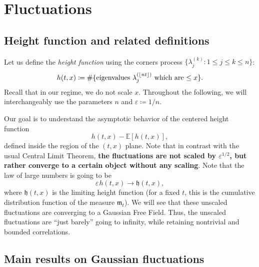 \documentclass[letterpaper,11pt,oneside,reqno]{book}
\numberwithin{equation}{chapter}  %
\newcommand{\ssp}{\hspace{1pt}}
\theoremstyle{definition}
\begin{document}
\section{Fluctuations}

\subsection{Height function and related definitions}

Let us define the \emph{height function} using the corners process
$\{ \lambda^{(k)}_j\colon 1\le j\le k\le n \}$:
\begin{equation*}
	h(t,x)\coloneqq \#
	\{ \textnormal{eigenvalues $\lambda^{(\lfloor nt \rfloor )}_j$ which
	are $\leq x$} \}.
\end{equation*}
Recall that in our regime, we do not scale $x$.
Throughout the following, we will interchangeably use
the parameters $n$ and
$\varepsilon\coloneqq 1/n$.

Our goal is to understand the asymptotic behavior of the centered height function
$$
h(t, x) - \mathbb{E}[h(t, x)]
,
$$
defined inside the region of the $(t,x)$ plane.
Note that in contrast with the usual Central Limit Theorem,
\textbf{the fluctuations are not scaled by $\varepsilon^{1/2}$,
but rather converge to a certain object without any scaling}.
Note that the law of large numbers is going to be
\begin{equation*}
	\varepsilon
	\ssp h(t, x) \to
	\mathfrak{h}(t,x),
\end{equation*}
where $\mathfrak{h}(t,x)$ is the limiting height function
(for a fixed $t$, this is the cumulative distribution function
of the measure $\mathfrak{m}_t$).
We will see that these unscaled fluctuations are
converging to a Gaussian Free Field. Thus,
the unscaled fluctuations
are ``just barely'' going to infinity,
while retaining nontrivial and bounded correlations.



\subsection{Main results on Gaussian fluctuations}
\end{document}
